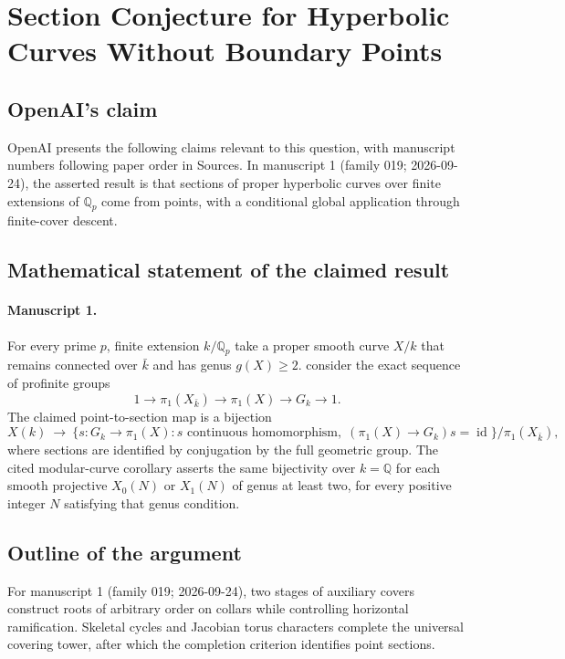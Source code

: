 \documentclass[11pt]{article}
\begin{document}
\section*{Section Conjecture for Hyperbolic Curves Without Boundary Points}

\subsection{OpenAI's claim}
OpenAI presents the following claims relevant to this question, with manuscript numbers following paper order in Sources. In manuscript 1 (family 019; 2026-09-24), the asserted result is that sections of proper hyperbolic curves over finite extensions of $\mathbb Q_p$ come from points, with a conditional global application through finite-cover descent.

\subsection{Mathematical statement of the claimed result}
\paragraph{Manuscript 1.}
For every prime $p$, finite extension $k/\mathbb Q_p$ take a proper smooth curve $X/k$ that remains connected over $\bar k$ and has genus $g(X)\ge2$. consider the exact sequence of profinite groups
\[
 1\longrightarrow\pi_1(X_{\bar k})\longrightarrow\pi_1(X)
 \longrightarrow G_k\longrightarrow1.
\]
The claimed point-to-section map is a bijection
\[
 X(k)\ \longrightarrow\
 \{s:G_k\to\pi_1(X):s\text{ continuous homomorphism},\;
             (\pi_1(X)\to G_k)s=\operatorname{id}\}/\pi_1(X_{\bar k}),
\]
where sections are identified by conjugation by the full geometric group. The cited modular-curve corollary asserts the same bijectivity over $k=\mathbb Q$ for each smooth projective $X_0(N)$ or $X_1(N)$ of genus at least two, for every positive integer $N$ satisfying that genus condition.

\subsection{Outline of the argument}
For manuscript 1 (family 019; 2026-09-24), two stages of auxiliary covers construct roots of arbitrary order on collars while controlling horizontal ramification. Skeletal cycles and Jacobian torus characters complete the universal covering tower, after which the completion criterion identifies point sections.
\end{document}
